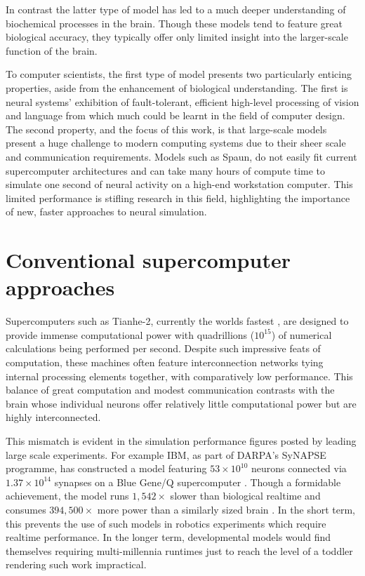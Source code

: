 		
		In contrast the latter type of model has led to a much deeper understanding
		of biochemical processes in the brain. Though these models tend to feature
		great biological accuracy, they typically offer only limited insight into
		the larger-scale function of the brain.
		
		To computer scientists, the first type of model presents two particularly
		enticing properties, aside from the enhancement of biological understanding.
		The first is neural systems' exhibition of fault-tolerant, efficient
		high-level processing of vision and language from which much could be learnt
		in the field of computer design. The second property, and the focus of this
		work, is that large-scale models present a huge challenge to modern
		computing systems due to their sheer scale and communication requirements.
		Models such as Spaun, do not easily fit current supercomputer architectures
		and can take many hours of compute time to simulate one second of neural
		activity on a high-end workstation computer. This limited performance is
		stifling research in this field, highlighting the importance of new, faster
		approaches to neural simulation.
	
	\section{Conventional supercomputer approaches}
	
		Supercomputers such as Tianhe-2, currently the worlds
		fastest \cite{meuer13n}, are designed to provide immense computational power
		with quadrillions ($10^{15}$) of numerical calculations being performed per
		second. Despite such impressive feats of computation, these machines often
		feature interconnection networks tying internal processing elements
		together, with comparatively low performance. This balance of great
		computation and modest communication contrasts with the brain whose
		individual neurons offer relatively little computational power but are
		highly interconnected.
		
		This mismatch is evident in the simulation performance figures posted by
		leading large scale experiments. For example IBM, as part of DARPA's SyNAPSE
		programme, has constructed a model featuring $53 \times 10^{10}$ neurons
		connected via $1.37 \times 10^{14}$ synapses on a Blue Gene/Q supercomputer
		\cite{ibm13}. Though a formidable achievement, the model runs $1,542\times$
		slower than biological realtime and consumes $394,500\times$ more power
		than a similarly sized brain \cite{drubach00}. In the short term, this
		prevents the use of such models in robotics experiments which require
		realtime performance. In the longer term, developmental models would find
		themselves requiring multi-millennia runtimes just to reach the level of a
		toddler rendering such work impractical.
		
